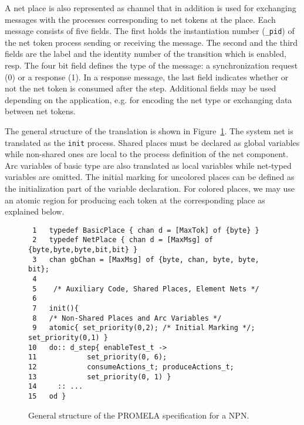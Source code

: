 \documentclass{llncs}
\begin{document}
A net place is also represented as channel that in addition  is used for exchanging messages with the processes corresponding to net tokens at the place. Each message consists of five fields. The first holds the instantiation number (\small\verb"_pid"\nfont) of the net token process sending or receiving the message. The second and the third fields are the label and the identity number of the transition which is enabled, resp. The four bit field defines the type of the message: a synchronization request (0) or a response (1). In a response message, the last field indicates whether or not the net token is consumed after the step. Additional fields may be used depending on the application, e.g. for encoding the net type or exchanging data between net tokens.



The general structure of the translation is shown in Figure~\ref{figStructSN}. The system net is translated as the \verb"init" process. Shared places must be declared as global variables while non-shared ones are local to the process definition of the net component. Arc variables of basic type are also translated as local variables while net-typed variables are omitted. The initial marking for uncolored places can be defined as the initialization part of the variable declaration. For colored places, we may use an atomic region for producing each token at the corresponding place as explained below.



\mfont
\begin{figure}
\begin{center}
\begin{verbatim}
 1   typedef BasicPlace { chan d = [MaxTok] of {byte} }
 2   typedef NetPlace { chan d = [MaxMsg] of {byte,byte,byte,bit,bit} }
 3   chan gbChan = [MaxMsg] of {byte, chan, byte, byte, bit};
 4
 5    /* Auxiliary Code, Shared Places, Element Nets */
 6
 7   init(){
 8   /* Non-Shared Places and Arc Variables */
 9   atomic{ set_priority(0,2); /* Initial Marking */; set_priority(0,1) }
10   do:: d_step{ enableTest_t ->
11            set_priority(0, 6);
12            consumeActions_t; produceActions_t;
13            set_priority(0, 1) }
14     :: ...
15   od }
\end{verbatim}
\end{center}
\vspace{-5pt}
\caption{General structure of the PROMELA specification for a NPN.}
\label{figStructSN}
\end{figure}
\nfont
\end{document}
